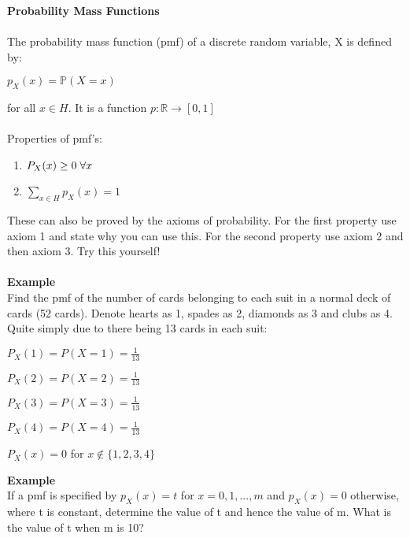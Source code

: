 \documentclass[,oneside]{article}
\begin{document}
\begin{enumerate}
\textbf{Probability Mass Functions}\\ \\
The probability mass function (pmf) of a discrete random variable, X is defined by:
\begin{center}
$p_X(x)=\mathbb{P}(X=x)$
\end{center}
for all $x \in H$. It is a function $p: \mathbb{R} \rightarrow [0,1]$\\ \\
Properties of pmf's:
\begin{enumerate}
\item $P_X(x)\geq 0 \hspace{0.1cm}\forall x$
\item $\sum\limits_{x \in H} p_X(x) = 1$\\
\end{enumerate}
These can also be proved by the axioms of probability. For the first property use axiom 1 and state why you can use this. For the second property use axiom 2 and then axiom 3. Try this yourself!\\ \\
\textbf{Example}\\
Find the pmf of the number of cards belonging to each suit in a normal deck of cards (52 cards). Denote hearts as 1, spades as 2, diamonds as 3 and clubs as 4.\\
Quite simply due to there being 13 cards in each suit:\\
\begin{center}
$P_X(1)=P(X=1)=\frac{1}{13}$\\
\end{center}
\begin{center}
$P_X(2)=P(X=2)=\frac{1}{13}$\\
\end{center}
\begin{center}
$P_X(3)=P(X=3)=\frac{1}{13}$\\
\end{center}
\begin{center}
$P_X(4)=P(X=4)=\frac{1}{13}$\\
\end{center}
\begin{center}
$P_X(x)=0$ for $x \notin \{1,2,3,4\}$
\end{center}
\textbf{Example}\\
If a pmf is specified by $p_X(x)=t$ for $x = 0,1,...,m$ and $p_X(x)=0$ otherwise, where t is constant, determine the value of t and hence the value of m. What is the value of t when m is 10?\\

\end{enumerate}
\end{document}
